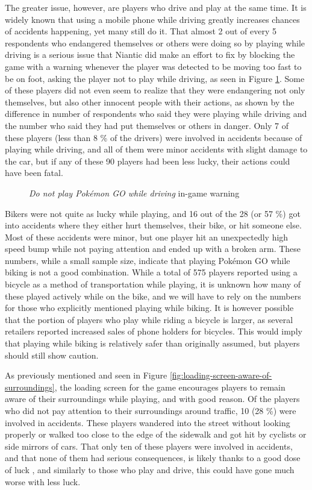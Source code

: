 The greater issue, however, are players who drive and play at the same time. It is widely known  that using a mobile phone while driving greatly increases chances of accidents happening, yet many still do it. That almost 2 out of every 5 respondents who endangered themselves or others were doing so by playing while driving is a serious issue that Niantic did make an effort to fix by blocking the game with a warning whenever the player was detected to be moving too fast to be on foot, asking the player not to play while driving, as seen in Figure \ref{fig:do-not-play-and-drive}. Some of these players did not even seem to realize that they were endangering not only themselves, but also other innocent people with their actions, as shown by the difference in number of respondents who said they were playing while driving and the number who said they had put themselves or others in danger. Only 7 of these players (less than 8 \% of the drivers) were involved in accidents because of playing while driving, and all of them were minor accidents with slight damage to the car, but if any of these 90 players had been less lucky, their actions could have been fatal. 

\begin{figure}[h]
	\centering
	\caption{\emph{Do not play Pokémon GO while driving} in-game warning}
	\label{fig:do-not-play-and-drive}
\end{figure}

Bikers were not quite as lucky while playing, and 16 out of the 28 (or 57 \%) got into accidents where they either hurt themselves, their bike, or hit someone else. Most of these accidents were minor, but one player hit an unexpectedly high speed bump while not paying attention and ended up with a broken arm. These numbers, while a small sample size, indicate that playing Pokémon GO while biking is not a good combination. While a total of 575 players reported using a bicycle as a method of transportation while playing, it is unknown how many of these played actively while on the bike, and we will have to rely on the numbers for those who explicitly mentioned playing while biking. It is however possible that the portion of players who play while riding a bicycle is larger, as several retailers reported increased sales of phone holders for bicycles. This would imply that playing while biking is relatively safer than originally assumed, but players should still show caution.

As previously mentioned and seen in Figure \ref{fig:loading-screen-aware-of-surroundings}, the loading screen for the game encourages players to remain aware of their surroundings while playing, and with good reason. Of the players who did not pay attention to their surroundings around traffic, 10 (28 \%) were involved in accidents. These players wandered into the street without looking properly or walked too close to the edge of the sidewalk and got hit by cyclists or side mirrors of cars. That only ten of these players were involved in accidents, and that none of them had serious consequences, is likely thanks to a good dose of luck , and similarly to those who play and drive, this could have gone much worse with less luck.

